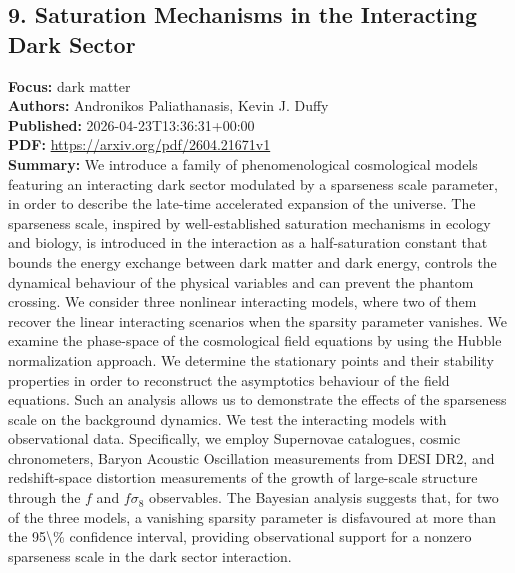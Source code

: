 \documentclass[11pt]{article}
\begin{document}
\subsection*{9. Saturation Mechanisms in the Interacting Dark Sector}
\textbf{Focus:} dark matter\\
\textbf{Authors:} Andronikos Paliathanasis, Kevin J. Duffy\\
\textbf{Published:} 2026-04-23T13:36:31+00:00\\
\textbf{PDF:} \href{https://arxiv.org/pdf/2604.21671v1}{https://arxiv.org/pdf/2604.21671v1}\\
\textbf{Summary:}
We introduce a family of phenomenological cosmological models featuring an interacting dark sector modulated by a sparseness scale parameter, in order to describe the late-time accelerated expansion of the universe. The sparseness scale, inspired by well-established saturation mechanisms in ecology and biology, is introduced in the interaction as a half-saturation constant that bounds the energy exchange between dark matter and dark energy, controls the dynamical behaviour of the physical variables and can prevent the phantom crossing. We consider three nonlinear interacting models, where two of them recover the linear interacting scenarios when the sparsity parameter vanishes. We examine the phase-space of the cosmological field equations by using the Hubble normalization approach. We determine the stationary points and their stability properties in order to reconstruct the asymptotics behaviour of the field equations. Such an analysis allows us to demonstrate the effects of the sparseness scale on the background dynamics. We test the interacting models with observational data. Specifically, we employ Supernovae catalogues, cosmic chronometers, Baryon Acoustic Oscillation measurements from DESI DR2, and redshift-space distortion measurements of the growth of large-scale structure through the $f$ and $f\sigma _8$ observables. The Bayesian analysis suggests that, for two of the three models, a vanishing sparsity parameter is disfavoured at more than the 95\textbackslash{}\% confidence interval, providing observational support for a nonzero sparseness scale in the dark sector interaction.
\newpage
\end{document}
